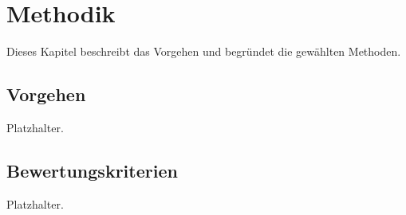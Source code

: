 
\chapter{Methodik}\label{ch:methodik}

Dieses Kapitel beschreibt das Vorgehen und begründet die gewählten Methoden.

\section{Vorgehen}\label{sec:vorgehen}

Platzhalter.

\section{Bewertungskriterien}\label{sec:kriterien}

Platzhalter.
